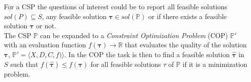 For a CSP the questions of interest could be to report all feasible solutions $sol(P) \subseteq S $, any feasible 
solution $\mathbf{\tau}\in sol(\mathbb{P})$ or if there exists a feasible solution $\mathbf{\tau}$ or not. \\
The CSP $\mathbb{P}$ can be expanded to a \emph{Constraint Optimization Problem} (COP) $\mathbb{P'}$ 
with an evaluation function $f(\mathbf{\tau}) \rightarrow \mathbb{R}$ that evaluates the quality of the solution 
$\mathbf{\tau}$, $\mathbb{P'} = \langle X,D,C,f) \rangle$.  In the COP the task is then to find a feasible solution 
$\hat{\mathbf{\tau}}$ in $S$ such that $f(\hat{\mathbf{\tau}}) \leq f(\mathbf{\tau})$ for all feasible solutions $\tau$ 
of $\mathbb{P}$ if it is a minimization problem. \\ 
  